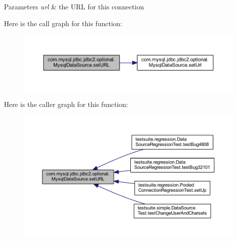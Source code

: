 \begin{DoxyParams}{Parameters}
{\em url} & the U\+RL for this connection \\
\hline
\end{DoxyParams}
Here is the call graph for this function\+:
\nopagebreak
\begin{figure}[H]
\begin{center}
\leavevmode
\includegraphics[width=350pt]{classcom_1_1mysql_1_1jdbc_1_1jdbc2_1_1optional_1_1_mysql_data_source_a44602f5e80027ae517af85b710e5651f_cgraph}
\end{center}
\end{figure}
Here is the caller graph for this function\+:
\nopagebreak
\begin{figure}[H]
\begin{center}
\leavevmode
\includegraphics[width=350pt]{classcom_1_1mysql_1_1jdbc_1_1jdbc2_1_1optional_1_1_mysql_data_source_a44602f5e80027ae517af85b710e5651f_icgraph}
\end{center}
\end{figure}
\mbox{\label{classcom_1_1mysql_1_1jdbc_1_1jdbc2_1_1optional_1_1_mysql_data_source_abdeb3391c72e2633372294991d9291fb}} 

